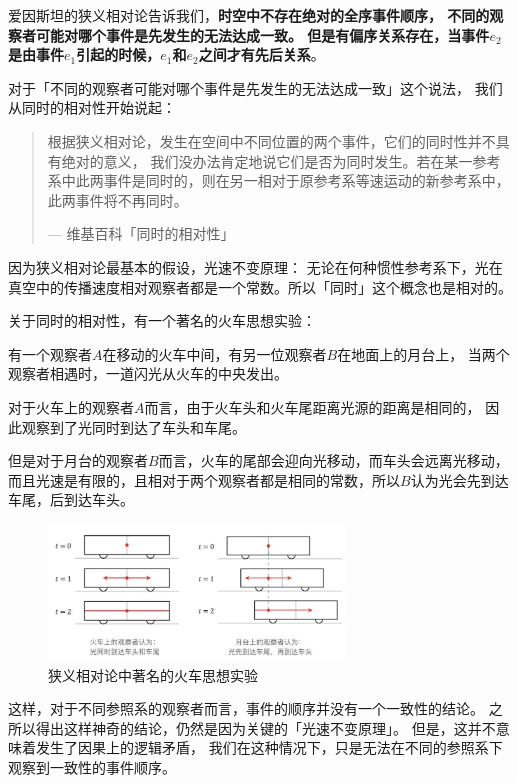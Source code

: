 \documentclass[cn,11pt,chinese]{elegantbook}
\begin{document}
爱因斯坦的狭义相对论告诉我们，\textbf{时空中不存在绝对的全序事件顺序， 不同的观察者可能对哪个事件是先发生的无法达成一致。 但是有偏序关系存在，当事件$e_2$是由事件$e_1$引起的时候，$e_1$和$e_2$之间才有先后关系}。

对于「不同的观察者可能对哪个事件是先发生的无法达成一致」这个说法， 我们从同时的相对性开始说起：

\begin{quote}
    根据狭义相对论，发生在空间中不同位置的两个事件，它们的同时性并不具有绝对的意义， 我们没办法肯定地说它们是否为同时发生。若在某一参考系中此两事件是同时的，则在另一相对于原参考系等速运动的新参考系中， 此两事件将不再同时。
    \begin{flushright}
        --- 维基百科「同时的相对性」
    \end{flushright}
\end{quote}

因为狭义相对论最基本的假设，光速不变原理： 无论在何种惯性参考系下，光在真空中的传播速度相对观察者都是一个常数。所以「同时」这个概念也是相对的。

关于同时的相对性，有一个著名的火车思想实验：

有一个观察者$A$在移动的火车中间，有另一位观察者$B$在地面上的月台上， 当两个观察者相遇时，一道闪光从火车的中央发出。

对于火车上的观察者$A$而言，由于火车头和火车尾距离光源的距离是相同的， 因此观察到了光同时到达了车头和车尾。

但是对于月台的观察者$B$而言，火车的尾部会迎向光移动，而车头会远离光移动， 而且光速是有限的，且相对于两个观察者都是相同的常数，所以$B$认为光会先到达车尾，后到达车头。

\begin{figure}
    \centering
    \includegraphics[width=0.7\textwidth]{images/appendix-a-06.jpeg}
    \caption{狭义相对论中著名的火车思想实验}
\end{figure}

这样，对于不同参照系的观察者而言，事件的顺序并没有一个一致性的结论。 之所以得出这样神奇的结论，仍然是因为关键的「光速不变原理」。 但是，这并不意味着发生了因果上的逻辑矛盾， 我们在这种情况下，只是无法在不同的参照系下观察到一致性的事件顺序。
\end{document}
